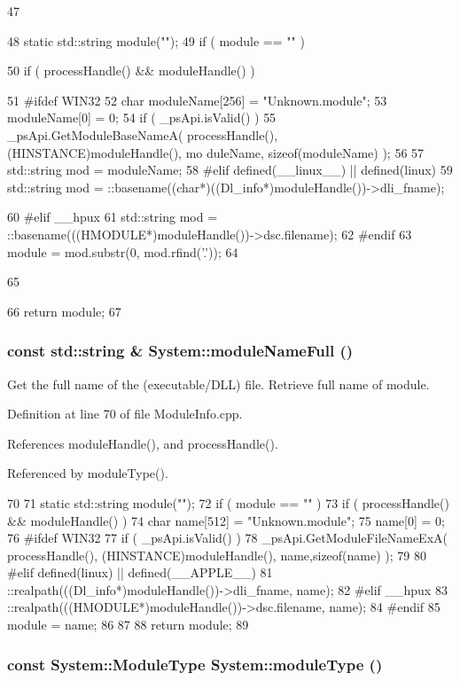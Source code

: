 \begin{DoxyCode}
47                                       {
48   static std::string module("");
49   if ( module == "" )   {
50     if ( processHandle() && moduleHandle() )    {
51 #ifdef WIN32
52       char moduleName[256] = {"Unknown.module"};
53       moduleName[0] = 0;
54       if ( _psApi.isValid() )   {
55         _psApi.GetModuleBaseNameA( processHandle(), (HINSTANCE)moduleHandle(), mo
      duleName, sizeof(moduleName) );
56       }
57       std::string mod = moduleName;
58 #elif defined(__linux__) || defined(linux)
59       std::string mod = ::basename((char*)((Dl_info*)moduleHandle())->dli_fname);
      
60 #elif __hpux
61       std::string mod = ::basename(((HMODULE*)moduleHandle())->dsc.filename);
62 #endif
63       module = mod.substr(0, mod.rfind('.'));
64     }
65   }
66   return module;
67 } 
\end{DoxyCode}
\hypertarget{namespaceSystem_abbb9e2ab2f883bfe24805d89bef43792}{
\subsubsection[{moduleNameFull}]{\setlength{\rightskip}{0pt plus 5cm}const std::string \& System::moduleNameFull ()}}
\label{namespaceSystem_abbb9e2ab2f883bfe24805d89bef43792}


Get the full name of the (executable/DLL) file. Retrieve full name of module. 

Definition at line 70 of file ModuleInfo.cpp.

References moduleHandle(), and processHandle().

Referenced by moduleType().


\begin{DoxyCode}
70                                           {
71   static std::string module("");
72   if ( module == "" )   {
73     if ( processHandle() && moduleHandle() )    {
74       char name[512] = {"Unknown.module"};
75       name[0] = 0;
76 #ifdef WIN32
77       if ( _psApi.isValid() )   {
78         _psApi.GetModuleFileNameExA( processHandle(), (HINSTANCE)moduleHandle(), 
      name,sizeof(name) );
79       }
80 #elif defined(linux) || defined(__APPLE__)
81       ::realpath(((Dl_info*)moduleHandle())->dli_fname, name);
82 #elif __hpux
83       ::realpath(((HMODULE*)moduleHandle())->dsc.filename, name);
84 #endif
85       module = name;
86     }
87   }
88   return module;
89 }
\end{DoxyCode}
\hypertarget{namespaceSystem_aa0cb1193baa6883c2686a0a87d56d228}{
\subsubsection[{moduleType}]{\setlength{\rightskip}{0pt plus 5cm}const {\bf System::ModuleType} System::moduleType ()}}
\label{namespaceSystem_aa0cb1193baa6883c2686a0a87d56d228}


